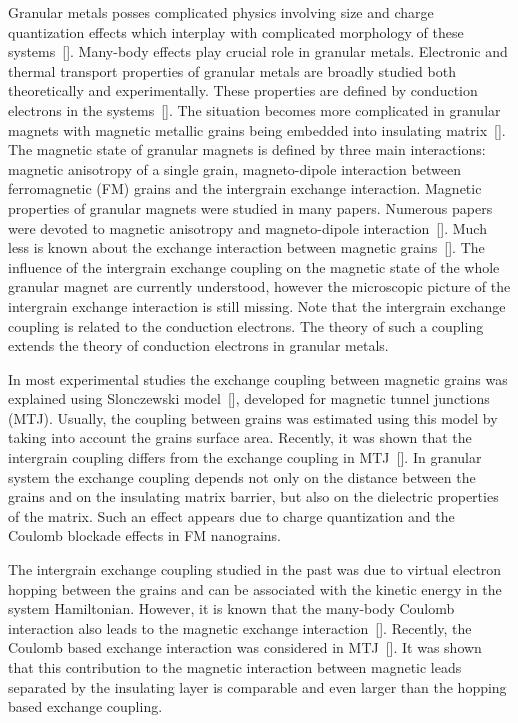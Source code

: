 \documentclass[aps,prb,amsmath,amssymb,twocolumn,superscriptaddress,showpacs,floatfix]{revtex4-1}
\begin{document}
Granular metals posses complicated physics involving size and charge quantization effects which
interplay with complicated morphology of these systems~[]. Many-body effects play crucial role in granular metals. Electronic and thermal transport properties of granular metals are broadly studied both theoretically and experimentally. These properties are defined by conduction electrons in the systems~[]. The
situation becomes more complicated in granular magnets with magnetic metallic grains being
embedded into insulating matrix~[]. The
magnetic state of granular magnets is defined by three main interactions: magnetic anisotropy
of a single grain, magneto-dipole interaction between ferromagnetic (FM) grains
and the intergrain exchange interaction. Magnetic properties of granular magnets
were studied in many papers. Numerous papers were devoted to magnetic anisotropy and magneto-dipole interaction~[].
Much less is known about the exchange interaction between
magnetic grains~[].
The influence of the intergrain exchange coupling on the magnetic state of the whole
granular magnet are currently understood, however the microscopic picture of the intergrain exchange
interaction is still missing. Note that the intergrain exchange coupling is related to the
conduction electrons. The theory of such a coupling extends the theory of conduction electrons in granular metals.

In most experimental studies the exchange coupling between magnetic grains
was explained using Slonczewski model~[],
developed for magnetic tunnel junctions (MTJ). Usually, the coupling between grains
was estimated using this model by taking into account the grains surface area.
Recently, it was shown that the intergrain coupling differs from the exchange
coupling in MTJ~[]. In granular system the exchange coupling depends
not only on the distance between the grains and on the insulating matrix barrier, but also
on the dielectric properties of the matrix. Such an effect appears due to charge quantization
and the Coulomb blockade effects in FM nanograins.


The intergrain exchange coupling studied in the past was due to virtual electron
hopping between the grains and can be associated with the kinetic energy in the system Hamiltonian.
However, it is known that the many-body Coulomb interaction
also leads to the magnetic exchange interaction~[].
Recently, the Coulomb based exchange interaction was considered in MTJ~[].
It was shown that this contribution to the magnetic interaction between magnetic leads
separated by the insulating layer is comparable and even larger than the hopping based exchange coupling.
\end{document}
